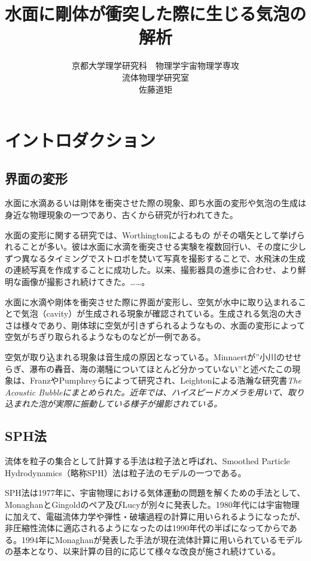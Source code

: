 \documentclass[]{jsarticle}
\begin{document}
\title{水面に剛体が衝突した際に生じる気泡の解析}
\author{京都大学理学研究科　物理学宇宙物理学専攻\\流体物理学研究室\\佐藤道矩}
\maketitle
\newpage

\tableofcontents
\newpage
\section{イントロダクション}
\subsection{界面の変形}
水面に水滴あるいは剛体を衝突させた際の現象、即ち水面の変形や気泡の生成は身近な物理現象の一つであり、古くから研究が行われてきた。

水面の変形に関する研究では、Worthingtonによるもの \cite{Worthington1908}がその嚆矢として挙げられることが多い。彼は水面に水滴を衝突させる実験を複数回行い、その度に少しずつ異なるタイミングでストロボを焚いて写真を撮影することで、水飛沫の生成の連続写真を作成することに成功した。以来、撮影器具の進歩に合わせ、より鮮明な画像が撮影され続けてきた。……。

水面に水滴や剛体を衝突させた際に界面が変形し、空気が水中に取り込まれることで気泡（cavity）が生成される現象が確認されている。生成される気泡の大きさは様々であり、剛体球に空気が引きずられるようなもの\cite{Worthington1908}\cite{Mallock1918}、水面の変形によって空気がちぎり取られるようなもの\cite{Oguz1990}などが一例である。

空気が取り込まれる現象は音生成の原因となっている。Minnaert\cite{minnaert1933xvi}が”小川のせせらぎ、瀑布の轟音、海の潮騒についてほとんど分かっていない”と述べたこの現象は、Franz\cite{Franz1959}やPumphrey\cite{Pumphrey1990}らによって研究され、Leightonによる浩瀚な研究書\it{The Acoustic Bubble}\cite{leightonacoustic}にまとめられた。近年では、ハイスピードカメラを用いて、取り込まれた泡が実際に振動している様子が撮影されている\cite{Phillips2018}。

\subsection{SPH法}
流体を粒子の集合として計算する手法は粒子法と呼ばれ、\rm{Smoothed Particle Hydrodynamics}（略称SPH）法は粒子法のモデルの一つである。

SPH法は1977年に、宇宙物理における気体運動の問題を解くための手法として、MonaghanとGingold\cite{Gingold1977}のペア及びLucy\cite{Lucy1977}が別々に発表した。1980年代には宇宙物理に加えて、電磁流体力学や弾性・破壊過程の計算に用いられるようになったが、非圧縮性流体に適応されるようになったのは1990年代の半ばになってからである。1994年にMonaghan\cite{Monaghan1994}が発表した手法が現在流体計算に用いられているモデルの基本となり、以来計算の目的に応じて様々な改良が施され続けている。
\end{document}
